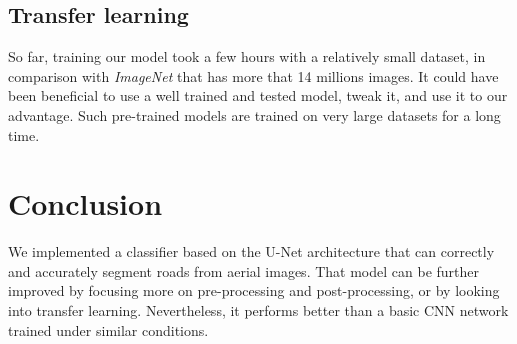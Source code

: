 \documentclass[10pt,conference,compsocconf]{IEEEtran}
\begin{document}
\subsection{Transfer learning}

So far, training our model took a few hours with a relatively small dataset, in comparison with \emph{ImageNet} that has more that 14 millions images. It could have been beneficial to use a well trained and tested model, tweak it, and use it to our advantage. Such pre-trained models are trained on very large datasets for a long time.

\section{Conclusion}

We implemented a classifier based on the U-Net architecture that can correctly and accurately segment roads from aerial images. That model can be further improved by focusing more on pre-processing and post-processing, or by looking into transfer learning. Nevertheless, it performs better than a basic CNN network trained under similar conditions.



\nocite{*}
\end{document}
